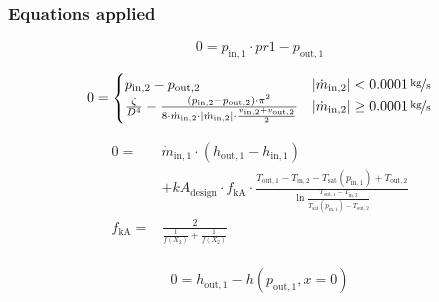 \subsubsection{Equations applied}

\begin{equation}
\label{eq:Condenser_pr1}
0=p_\mathrm{in,1}\cdot pr1 - p_\mathrm{out,1}
\end{equation}

\begin{equation}
\label{eq:Condenser_zeta2}
0 = \begin{cases}
p_\mathrm{in,2}- p_\mathrm{out,2} & |\dot{m}_\mathrm{in,2}| < \unitfrac[0.0001]{kg}{s} \\
\frac{\zeta}{D^4}-\frac{(p_\mathrm{in,2}-p_\mathrm{out,2})\cdot\pi^2}{8\cdot\dot{m}_\mathrm{in,2}\cdot|\dot{m}_\mathrm{in,2}|\cdot\frac{v_\mathrm{in,2} + v_\mathrm{out,2}}{2}}& |\dot{m}_\mathrm{in,2}| \geq \unitfrac[0.0001]{kg}{s}
\end{cases}
\end{equation}

\begin{equation}
\label{eq:Condenser_kA_char}
\begin{split}
0 = & \dot{m}_\mathrm{in,1} \cdot \left( h_\mathrm{out,1} - h_\mathrm{in,1}\right)\\
&+kA_\mathrm{design} \cdot f_\mathrm{kA} \cdot \frac{T_\mathrm{out,1} - T_\mathrm{in,2} - T_\mathrm{sat}\left( p_\mathrm{in,1}\right) +T_\mathrm{out,2}}{\ln{\frac{T_\mathrm{out,1}-T_\mathrm{in,2}}{T_\mathrm{sat}\left( p_\mathrm{in,1}\right)- T_\mathrm{out,2}}}}\\
f_\mathrm{kA}=&\frac{2}{\frac{1}{f\left(X_2\right)}+\frac{1}{f\left(X_2\right)}}\\
\end{split}
\end{equation}

\begin{equation}
\label{eq:Condenser_subcooling}
0=h_\mathrm{out,1} -h\left(p_\mathrm{out,1}, x=0 \right)
\end{equation}


